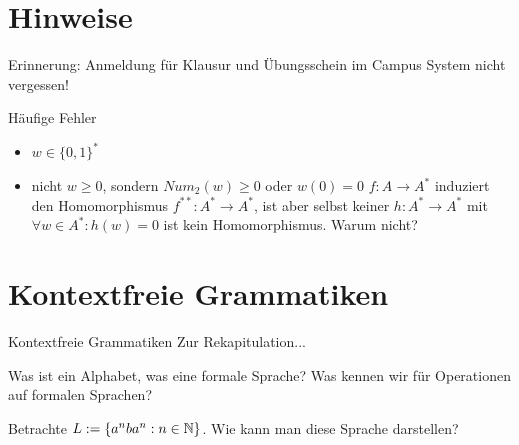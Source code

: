 \documentclass[]{beamer}
\begin{document}
	
	
\begin{frame}
	\titlepage
\end{frame}

\section{Hinweise}

\begin{frame}
Erinnerung: Anmeldung für Klausur und Übungsschein im Campus System nicht vergessen!
\end{frame}

\begin{frame} {Häufige Fehler}
\begin{itemize}
	\item $w \in \{0, 1\}^*$
	\item nicht $w \geq 0$, sondern $Num_2 (w) \geq 0$ oder $w(0)=0$
	\pitem $f:A \rightarrow A^*$ induziert den Homomorphismus $f^{**}:A^* \rightarrow A^*$, ist aber selbst keiner
	\pitem $h:A^* \rightarrow A^*$ mit $\forall w \in A^*: h(w) = 0$ ist kein Homomorphismus. Warum nicht?
\end{itemize}
\end{frame}

\section{Kontextfreie Grammatiken}
\begin{frame}{Kontextfreie Grammatiken}
	Zur Rekapitulation...
	
	\begin{itemize}
		\pitem Was ist ein Alphabet, was eine formale Sprache?
		\pitem Was kennen wir für Operationen auf formalen Sprachen?
	\end{itemize}

	\bp 
	
	Betrachte $L := \{a^nba^n : n \in \mathbb{N} \}$. \ip Wie kann man diese Sprache darstellen?
\end{frame}
\end{document}
